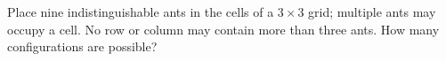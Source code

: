 Place nine indistinguishable ants in the cells of a $3\times3$ grid; multiple ants may occupy a cell. No row or column may contain more than three ants. How many configurations are possible?
